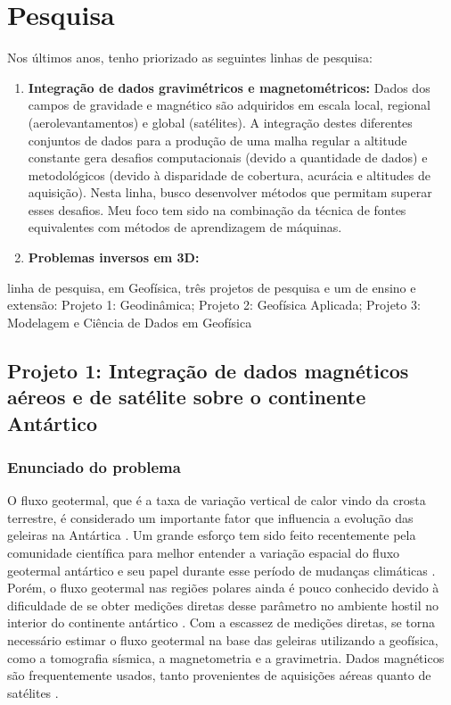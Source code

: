 \documentclass[12pt,a4paper,oneside]{book}
\begin{document}
\chapter{Pesquisa}

Nos últimos anos, tenho priorizado as seguintes linhas de pesquisa:

\begin{enumerate}
  \item \textbf{Integração de dados gravimétricos e magnetométricos:}
    Dados dos campos de gravidade e magnético são adquiridos em escala local,
    regional (aerolevantamentos) e global (satélites). A integração destes
    diferentes conjuntos de dados para a produção de uma malha regular a
    altitude constante gera desafios computacionais (devido a quantidade de dados) e metodológicos (devido à disparidade de cobertura, acurácia e altitudes
    de aquisição). Nesta linha, busco desenvolver métodos que permitam superar
    esses desafios. Meu foco tem sido na combinação da técnica de fontes
    equivalentes com métodos de aprendizagem de máquinas.
  \item \textbf{Problemas inversos em 3D:}
\end{enumerate}

linha de pesquisa, em Geofísica, três projetos de pesquisa e um de ensino e
extensão: Projeto 1: Geodinâmica; Projeto 2: Geofísica Aplicada; Projeto 3: Modelagem e
Ciência de Dados em Geofísica


\section{%
  Projeto 1: Integração de dados magnéticos aéreos e de satélite sobre o
  continente Antártico
}

\subsection{Enunciado do problema}

O fluxo geotermal, que é a taxa de variação vertical de calor vindo da
crosta terrestre, é considerado um importante fator que influencia a evolução
das geleiras na Antártica \citep{Seroussi2017}.
Um grande esforço tem sido feito recentemente pela comunidade científica para
melhor entender a variação espacial do fluxo geotermal antártico e seu papel
durante esse período de mudanças climáticas \citep{BurtonJohnson2020}.
Porém, o fluxo geotermal nas regiões polares ainda é pouco conhecido devido à
dificuldade de se obter medições diretas desse parâmetro no ambiente hostil no
interior do continente antártico \citep{BurtonJohnson2020}.
Com a escassez de medições diretas, se torna necessário estimar o fluxo
geotermal na base das geleiras utilizando a geofísica, como a tomografia
sísmica, a magnetometria e a gravimetria.
Dados magnéticos são frequentemente usados, tanto provenientes de aquisições
aéreas \citep[e.g.,][]{Lowe2023} quanto de satélites
\citep[e.g.,][]{FoxMaule2005}.
\end{document}
